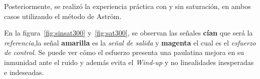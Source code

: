 \twocolumn

Posteriormente, se realizó la experiencia práctica con y sin saturación, en ambos casos utilizando el método de Astr\"om.

En la figura~\ref{fig:sinsat300} y~\ref{fig:sat300}, se observan las señales \textbf{cían} que será la \textit{referencia},la señal \textbf{amarilla} es la \textit{señal de salida} y \textbf{magenta} el cual es el \textit{esfuerzo de control}.
Se puede ver cómo el esfuerzo presenta una paulatina mejora en su inmunidad ante el ruido y además evita el \textit{Wind-up} y no linealidades inesperadas e indeseadas. \hfill \break






